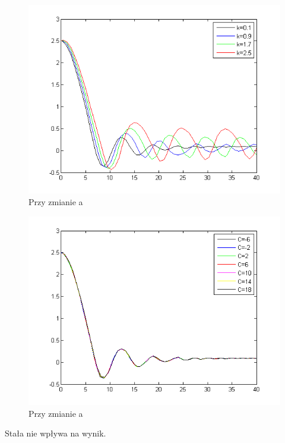 \documentclass[a4paper,10pt]{article}
\begin{document}
\begin{enumerate}
\begin{figure}[!h]
    \centering
	\includegraphics[width=120mm]{CW3-korekcja-trojpolozeniowy-e_k.png}
	\caption{Przy zmianie a}
    \label{fig:Rysunek}
\end{figure}

\begin{figure}[!h]
    \centering
	\includegraphics[width=120mm]{CW3-korekcja-trojpolozeniowy-e_C.png}
	\caption{Przy zmianie a}
    \label{fig:Rysunek}
\end{figure}

Stała nie wpływa na wynik.


\end{enumerate}
\end{document}
